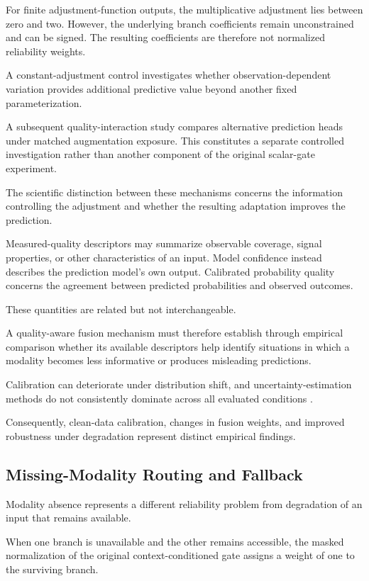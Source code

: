 For finite adjustment-function outputs, the multiplicative adjustment lies between zero and two. However, the underlying branch coefficients remain unconstrained and can be signed. The resulting coefficients are therefore not normalized reliability weights.

A constant-adjustment control investigates whether observation-dependent variation provides additional predictive value beyond another fixed parameterization.

A subsequent quality-interaction study compares alternative prediction heads under matched augmentation exposure. This constitutes a separate controlled investigation rather than another component of the original scalar-gate experiment.

The scientific distinction between these mechanisms concerns the information controlling the adjustment and whether the resulting adaptation improves the prediction.

Measured-quality descriptors may summarize observable coverage, signal properties, or other characteristics of an input. Model confidence instead describes the prediction model’s own output. Calibrated probability quality concerns the agreement between predicted probabilities and observed outcomes.

These quantities are related but not interchangeable.

A quality-aware fusion mechanism must therefore establish through empirical comparison whether its available descriptors help identify situations in which a modality becomes less informative or produces misleading predictions.

Calibration can deteriorate under distribution shift, and uncertainty-estimation methods do not consistently dominate across all evaluated conditions \parencite{P008}.

Consequently, clean-data calibration, changes in fusion weights, and improved robustness under degradation represent distinct empirical findings.

\subsection{Missing-Modality Routing and Fallback}

Modality absence represents a different reliability problem from degradation of an input that remains available.

When one branch is unavailable and the other remains accessible, the masked normalization of the original context-conditioned gate assigns a weight of one to the surviving branch.

